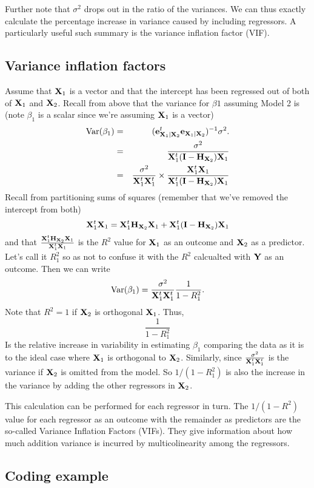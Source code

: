 Further note that $\sigma^2$ drops out in the ratio of the variances. We can thus
exactly calculate the percentage increase in variance caused by including regressors.
A particularly useful such summary is the variance inflation factor (VIF). 

\subsection{Variance inflation factors}
Assume that $\mathbf{X}_1$ is a vector and that the intercept has been regressed out of 
both of $\mathbf{X}_1$ and $\mathbf{X}_2$. Recall from above that the variance for $\beta1$ assuming
Model 2 is (note $\beta_1$ is a scalar since we're assuming $\mathbf{X}_1$ is a vector)
\begin{eqnarray*}
\mbox{Var}(\beta_1) & = & (\mathbf{e}_{\mathbf{X}_1 | \mathbf{X}_2}^t \mathbf{e}_{\mathbf{X}_1 | \mathbf{X}_2})^{-1} \sigma^2.\\
& = & \frac{\sigma^2}{\mathbf{X}_1^t (\mathbf{I} - \mathbf{H}_{\mathbf{X}_2}) \mathbf{X}_1} \\
& = & \frac{\sigma^2}{\mathbf{X}_1^t \mathbf{X}_1^t} \times \frac{\mathbf{X}_1^t \mathbf{X}_1}{\mathbf{X}_1^t (\mathbf{I} - \mathbf{H}_{\mathbf{X}_2}) \mathbf{X}_1}
\end{eqnarray*}
Recall from partitioning sums of squares (remember that we've removed the intercept from both)
$$
\mathbf{X}_1^t\mathbf{X}_1 = \mathbf{X}_1^t \mathbf{H}_{\mathbf{X}_2} \mathbf{X}_1 + \mathbf{X}_1^t (\mathbf{I} - \mathbf{H}_{\mathbf{X}_2}) \mathbf{X}_1
$$
and that $\frac{\mathbf{X}_1^t \mathbf{H}_{\mathbf{X}_2} \mathbf{X}_1}{\mathbf{X}_1^t\mathbf{X}_1}$ is the $R^2$ value for $\mathbf{X}_1$
as an outcome and $\mathbf{X}_2$ as a predictor. Let's call it $R^2_1$ so as not to confuse
it with the $R^2$ calcualted with $\mathbf{Y}$ as an outcome. Then we can write
$$
\mbox{Var}(\beta_1) =  \frac{\sigma^2}{\mathbf{X}_1^t \mathbf{X}_1^t} \frac{1}{1 - R^2_1}.
$$
Note that $R^2 = 1$ if $\mathbf{X}_2$ is orthogonal $\mathbf{X}_1$. Thus,
$$
\frac{1}{1 - R^2_1}
$$
Is the relative increase in variability in estimating $\beta_1$
comparing the data as it is to the ideal case where $\mathbf{X}_1$ is orthogonal to $\mathbf{X}_2$. 
Similarly, since $\frac{\sigma^2}{\mathbf{X}_1^t \mathbf{X}_1^t}$ is the variance if $\mathbf{X}_2$ is omitted
from the model. So $1 / (1 - R^2_1)$ is also the increase in the variance by adding the
other regressors in $\mathbf{X}_2$.

This calculation can be performed for each regressor in turn. The $1 / (1 - R^2)$ value
for each regressor as an outcome with the remainder as predictors are the so-called
Variance Inflation Factors (VIFs). They give information about how much addition
variance is incurred by multicolinearity among the regressors.


\subsection{Coding example}

